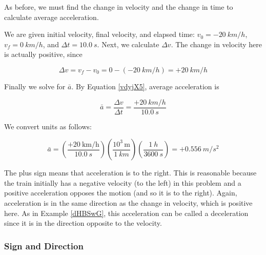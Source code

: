 \documentclass[../../main-ap-physics.tex]{subfiles}
\begin{document}
As before, we must find the change in velocity and the change in time to calculate average acceleration.

\vspace{1em}

We are given initial velocity, final velocity, and elapsed time: $v_0 = -\SI{20}{km/h}$, $v_f = \SI{0}{km/h}$, and $\Delta t = \SI{10.0}{s}$. Next, we calculate $\Delta v$. The change in velocity here is actually positive, since

\begin{equation*}
    \Delta v = v_f - v_0 = 0 - \left(-\SI{20}{km/h}\right) = +\SI{20}{km/h}
\end{equation*}

Finally we solve for $\bar{a}$. By Equation \ref{vdyjX5}, average acceleration is

\begin{equation*}
    \bar{a} = \frac{\Delta v}{\Delta t} = \frac{+\SI{20}{km/h}}{\SI{10.0}{s}}
\end{equation*}

We convert units as follows:

\begin{equation*}
    \bar{a} = \left(\frac{+\SI[per-mode=fraction]{20}{\kilo\meter\per\hour}}{\SI{10.0}{s}}\right)
        \left(\frac{10^3\,\text{m}}{\SI{1}{km}}\right)\left(\frac{\SI{1}{h}}{\SI{3600}{s}}\right) = +\SI{0.556}{m/s^2}
\end{equation*}

The plus sign means that acceleration is to the right. This is reasonable because the train initially has a negative velocity (to the left) in this problem and a positive acceleration opposes the motion (and so it is to the right). Again, acceleration is in the same direction as the change in velocity, which is positive here. As in Example \ref{dHBSwG}, this acceleration can be called a deceleration since it is in the direction opposite to the velocity.

\endsolution

\subsubsection*{Sign and Direction}
\end{document}
